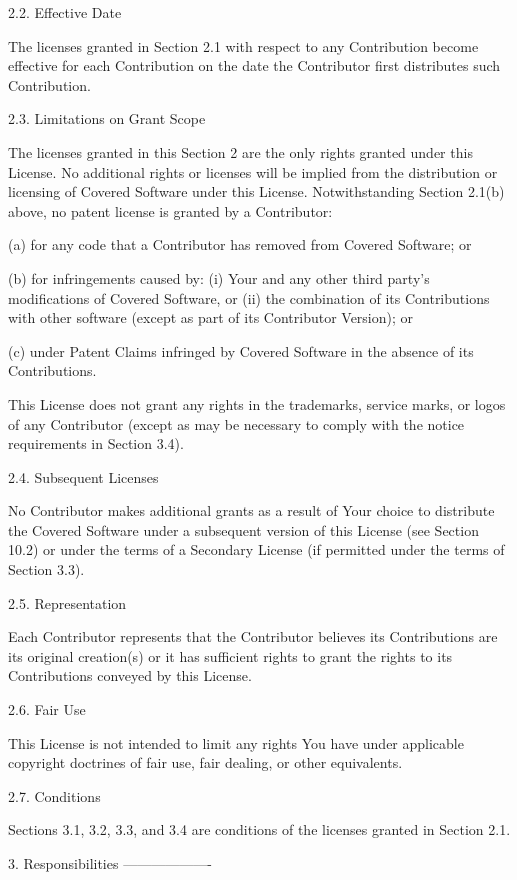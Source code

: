 2.2. Effective Date

The licenses granted in Section 2.1 with respect to any Contribution
become effective for each Contribution on the date the Contributor first
distributes such Contribution.

2.3. Limitations on Grant Scope

The licenses granted in this Section 2 are the only rights granted under
this License. No additional rights or licenses will be implied from the
distribution or licensing of Covered Software under this License.
Notwithstanding Section 2.1(b) above, no patent license is granted by a
Contributor:

(a) for any code that a Contributor has removed from Covered Software;
    or

(b) for infringements caused by: (i) Your and any other third party's
    modifications of Covered Software, or (ii) the combination of its
    Contributions with other software (except as part of its Contributor
    Version); or

(c) under Patent Claims infringed by Covered Software in the absence of
    its Contributions.

This License does not grant any rights in the trademarks, service marks,
or logos of any Contributor (except as may be necessary to comply with
the notice requirements in Section 3.4).

2.4. Subsequent Licenses

No Contributor makes additional grants as a result of Your choice to
distribute the Covered Software under a subsequent version of this
License (see Section 10.2) or under the terms of a Secondary License (if
permitted under the terms of Section 3.3).

2.5. Representation

Each Contributor represents that the Contributor believes its
Contributions are its original creation(s) or it has sufficient rights
to grant the rights to its Contributions conveyed by this License.

2.6. Fair Use

This License is not intended to limit any rights You have under
applicable copyright doctrines of fair use, fair dealing, or other
equivalents.

2.7. Conditions

Sections 3.1, 3.2, 3.3, and 3.4 are conditions of the licenses granted
in Section 2.1.

3. Responsibilities
-------------------

